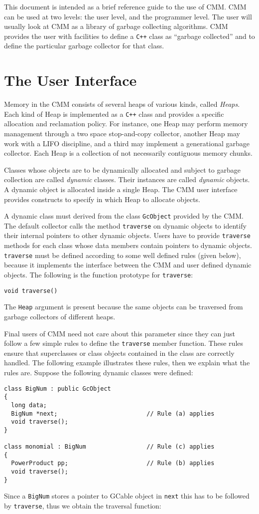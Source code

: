 This document is intended as a brief reference guide to the use
of CMM.  CMM can be used at two levels: the user level, and the
programmer level.  The user will usually look at CMM as a library of
garbage collecting algorithms.  CMM provides the user with facilities to
define a {\tt C++} class as ``garbage collected'' and to define the 
particular garbage collector for that class.

\section {The User Interface}

Memory in the CMM consists of several heaps of various kinds, called {\em
Heaps}.  Each kind of Heap is implemented as a {\tt C++} class and
provides a specific allocation and reclamation policy.  For instance, one
Heap may perform memory management through a two space stop-and-copy
collector, another Heap may work with a LIFO discipline, and a third may
implement a generational garbage collector.  Each Heap is a collection of
not necessarily contiguous memory chunks.

Classes whose objects are to be dynamically allocated and subject to garbage
collection are called {\em dynamic\/} classes.  Their instances are called {\em
dynamic\/} objects.  A dynamic object is allocated inside a single Heap.
The CMM user interface provides constructs to specify in which Heap to
allocate objects.


A dynamic class must derived from the class {\tt GcObject} provided by the CMM.
The default collector calls the method {\tt traverse} on dynamic objects to
identify their internal pointers to other dynamic objects.  Users have to
provide {\tt traverse} methods for each class whose data members contain
pointers to dynamic objects.  {\tt traverse} must be defined according to some
well defined rules (given below), because it implements the interface between
the CMM and user defined dynamic objects.  The following is the function
prototype for {\tt traverse}:
\begin{verbatim}
void traverse()
\end{verbatim}
The {\tt Heap} argument is present because the same objects can be
traversed from garbage collectors of different heaps.

Final users of CMM need not care about this
parameter since they can just follow a few simple rules to define the
{\tt traverse} member function.  These rules ensure that superclasses or
class objects contained in the class are correctly handled.  The
following example illustrates these rules, then we explain what the rules are.
Suppose the following dynamic classes were defined:
\begin{verbatim}
class BigNum : public GcObject
{
  long data;
  BigNum *next;                         // Rule (a) applies
  void traverse();
}

class monomial : BigNum                 // Rule (c) applies
{
  PowerProduct pp;                      // Rule (b) applies
  void traverse();
}
\end{verbatim}
Since a {\tt BigNum} stores a pointer to GCable object in
{\tt next} this has to be followed by {\tt traverse}, thus we obtain the
traversal function:

